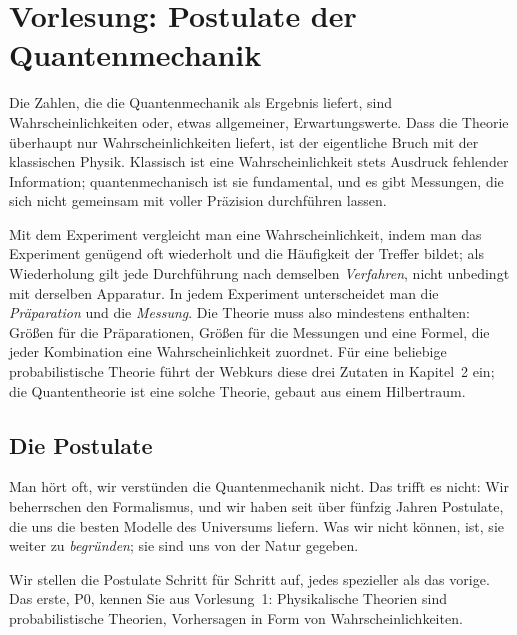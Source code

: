 \section{Vorlesung: Postulate der Quantenmechanik}
Die Zahlen, die die Quantenmechanik als Ergebnis liefert, sind Wahrscheinlichkeiten oder, etwas allgemeiner, Erwartungswerte. Dass die Theorie überhaupt nur Wahrscheinlichkeiten liefert, ist der eigentliche Bruch mit der klassischen Physik. Klassisch ist eine Wahrscheinlichkeit stets Ausdruck fehlender Information; quantenmechanisch ist sie fundamental, und es gibt Messungen, die sich nicht gemeinsam mit voller Präzision durchführen lassen.

Mit dem Experiment vergleicht man eine Wahrscheinlichkeit, indem man das Experiment genügend oft wiederholt und die Häufigkeit der Treffer bildet; als Wiederholung gilt jede Durchführung nach demselben \emph{Verfahren}, nicht unbedingt mit derselben Apparatur. In jedem Experiment unterscheidet man die \emph{Präparation} und die \emph{Messung}. Die Theorie muss also mindestens enthalten: Größen für die Präparationen, Größen für die Messungen und eine Formel, die jeder Kombination eine Wahrscheinlichkeit zuordnet. Für eine beliebige probabilistische Theorie führt der Webkurs diese drei Zutaten in Kapitel~2 ein; die Quantentheorie ist eine solche Theorie, gebaut aus einem Hilbertraum.

\subsection{Die Postulate}

\begin{greybox}
Man hört oft, wir verstünden die Quantenmechanik nicht. Das trifft es nicht: Wir beherrschen den Formalismus, und wir haben seit über fünfzig Jahren Postulate, die uns die besten Modelle des Universums liefern. Was wir nicht können, ist, sie weiter zu \emph{begründen}; sie sind uns von der Natur gegeben.
\end{greybox}

Wir stellen die Postulate Schritt für Schritt auf, jedes spezieller als das vorige. Das erste, P0, kennen Sie aus Vorlesung~1: Physikalische Theorien sind probabilistische Theorien, Vorhersagen in Form von Wahrscheinlichkeiten.

